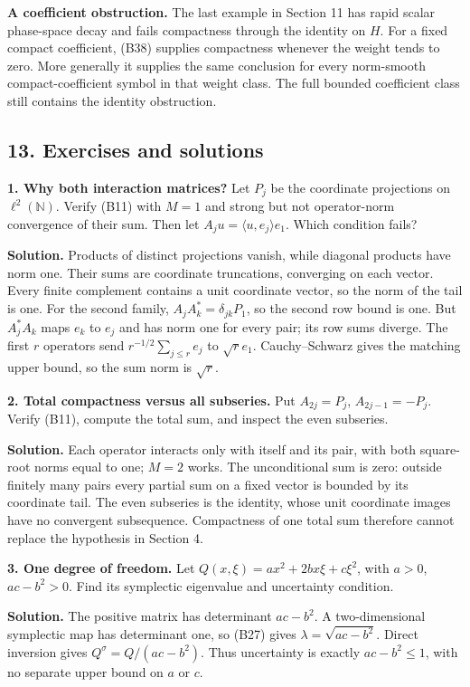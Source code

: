 \documentclass[
  11pt,
]{article}
\begin{document}
\textbf{A coefficient obstruction.} The last example in Section 11 has
rapid scalar phase-space decay and fails compactness through the
identity on \(H\). For a fixed compact coefficient, (B38) supplies
compactness whenever the weight tends to zero. More generally it
supplies the same conclusion for every norm-smooth compact-coefficient
symbol in that weight class. The full bounded coefficient class still
contains the identity obstruction.

\subsection{13. Exercises and solutions}\label{exercises-and-solutions}

\textbf{1. Why both interaction matrices?} Let \(P_j\) be the coordinate
projections on \(\ell^2(\mathbb N)\). Verify (B11) with \(M=1\) and
strong but not operator-norm convergence of their sum. Then let
\(A_ju=\langle u,e_j\rangle e_1\). Which condition fails?

\textbf{Solution.} Products of distinct projections vanish, while
diagonal products have norm one. Their sums are coordinate truncations,
converging on each vector. Every finite complement contains a unit
coordinate vector, so the norm of the tail is one. For the second
family, \(A_jA_k^*=\delta_{jk}P_1\), so the second row bound is one. But
\(A_j^*A_k\) maps \(e_k\) to \(e_j\) and has norm one for every pair;
its row sums diverge. The first \(r\) operators send
\(r^{-1/2}\sum_{j\le r}e_j\) to \(\sqrt r e_1\). Cauchy--Schwarz gives
the matching upper bound, so the sum norm is \(\sqrt r\).

\textbf{2. Total compactness versus all subseries.} Put \(A_{2j}=P_j\),
\(A_{2j-1}=-P_j\). Verify (B11), compute the total sum, and inspect the
even subseries.

\textbf{Solution.} Each operator interacts only with itself and its
pair, with both square-root norms equal to one; \(M=2\) works. The
unconditional sum is zero: outside finitely many pairs every partial sum
on a fixed vector is bounded by its coordinate tail. The even subseries
is the identity, whose unit coordinate images have no convergent
subsequence. Compactness of one total sum therefore cannot replace the
hypothesis in Section 4.

\textbf{3. One degree of freedom.} Let \(Q(x,\xi)=ax^2+2bx\xi+c\xi^2\),
with \(a>0\), \(ac-b^2>0\). Find its symplectic eigenvalue and
uncertainty condition.

\textbf{Solution.} The positive matrix has determinant \(ac-b^2\). A
two-dimensional symplectic map has determinant one, so (B27) gives
\(\lambda=\sqrt{ac-b^2}\). Direct inversion gives
\(Q^\sigma=Q/(ac-b^2)\). Thus uncertainty is exactly \(ac-b^2\le1\),
with no separate upper bound on \(a\) or \(c\).
\end{document}
